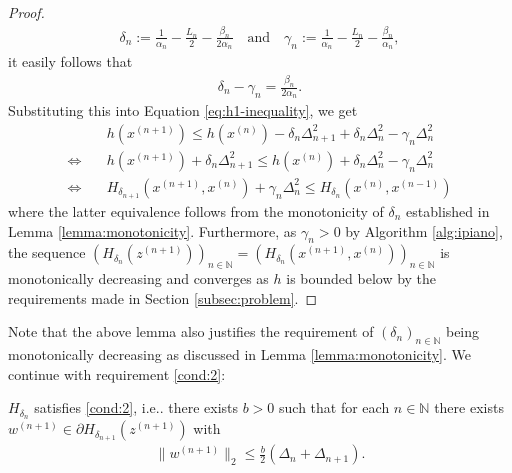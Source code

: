 \documentclass[onecolumn,final,a4paper,13pt,reqno]{siamart}
\makeatletter
\DeclareRobustCommand\onedot{\futurelet\@let@token\@onedot}
\def\@onedot{\ifx\@let@token.\else.\null\fi\xspace}
\def\ie{{i.e}\onedot} \def\Ie{{I.e}\onedot}
\makeatother
\begin{document}
\begin{proof}
	\begin{align}
		\delta_n := \frac{1}{\alpha_n} - \frac{L_n}{2} - \frac{\beta_n}{2\alpha_n}\quad\text{and}\quad\gamma_n := \frac{1}{\alpha_n} - \frac{L_n}{2} - \frac{\beta_n}{\alpha_n},
	\end{align}
	it easily follows that
	\begin{align}
		\delta_n - \gamma_n = \frac{\beta_n}{2\alpha_n}.\label{eq:h1-delta-gamma}
	\end{align}
	Substituting this into Equation \eqref{eq:h1-inequality}, we get
	\begin{align}
		&h(x^{(n + 1)}) \leq h(x^{(n)}) - \delta_n \Delta_{n + 1}^2 + \delta_n \Delta_n^2 - \gamma_n \Delta_n^2\\
		\Leftrightarrow\quad&h(x^{(n + 1)}) + \delta_n \Delta_{n + 1}^2 \leq h(x^{(n)}) + \delta_n\Delta_n^2 - \gamma_n \Delta_n^2\\
		\Leftrightarrow\quad&H_{\delta_{n + 1}}(x^{(n + 1)}, x^{(n)}) + \gamma_n \Delta_n^2 \leq H_{\delta_n}(x^{(n)}, x^{(n - 1)})
	\end{align}
	where the latter equivalence follows from the monotonicity of $\delta_n$ established in Lemma \ref{lemma:monotonicity}. Furthermore, as $\gamma_n > 0$ by Algorithm \ref{alg:ipiano}, the sequence $(H_{\delta_n}(z^{(n + 1)}))_{n \in \mathbb{N}} = (H_{\delta_n}(x^{(n + 1)}, x^{(n)}))_{n \in \mathbb{N}}$ is monotonically decreasing and converges as $h$ is bounded below by the requirements made in Section \ref{subsec:problem}.
\end{proof}

Note that the above lemma also justifies the requirement of $(\delta_n)_{n \in \mathbb{N}}$ being monotonically decreasing as discussed in Lemma \ref{lemma:monotonicity}. We continue with requirement \ref{cond:2}:

\begin{lemmamd}
	$H_{\delta_n}$ satisfies \ref{cond:2}, \ie there exists $b > 0$ such that for each $n \in \mathbb{N}$ there exists $w^{(n + 1)} \in \partial H_{\delta_{n + 1}}(z^{(n + 1)})$ with
	\begin{align}
		\|w^{(n + 1)}\|_2 \leq \frac{b}{2} (\Delta_n + \Delta_{n + 1}).
	\end{align}
\end{lemmamd}
\end{document}
